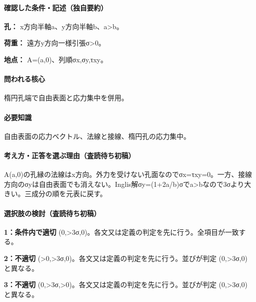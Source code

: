 \paragraph{確認した条件・記述（独自要約）}\mbox{}\par

\noindent\textbf{孔：} x方向半軸a、y方向半軸b、a>b。\par

\noindent\textbf{荷重：} 遠方y方向一様引張σ>0。\par

\noindent\textbf{地点：} A=\allowbreak{}(a,0)、列順σx,σy,τxy。\par

\paragraph{問われる核心} 楕円孔端で自由表面と応力集中を併用。

\paragraph{必要知識} 自由表面の応力ベクトル、法線と接線、楕円孔の応力集中。

\paragraph{考え方・正答を選ぶ理由（査読待ち初稿）} A(a,0)の孔縁の法線はx方向。外力を受けない孔面なのでσx=τxy=\allowbreak{}0。一方、接線方向のσyは自由表面でも消えない。Inglis解σy=\allowbreak{}(1+2a/b)σでa>bなので3σより大きい。三成分の順を元表に戻す。

\paragraph{選択肢の検討（査読待ち初稿）}\mbox{}\par

\noindent\textbf{1：条件内で適切} (0,>3σ,0)。各文又は定義の判定を先に行う。全項目が一致する。\par

\noindent\textbf{2：不適切} (>0,>3σ,0)。各文又は定義の判定を先に行う。並びが判定 (0,>3σ,0) と異なる。\par

\noindent\textbf{3：不適切} (0,>3σ,>0)。各文又は定義の判定を先に行う。並びが判定 (0,>3σ,0) と異なる。\par


